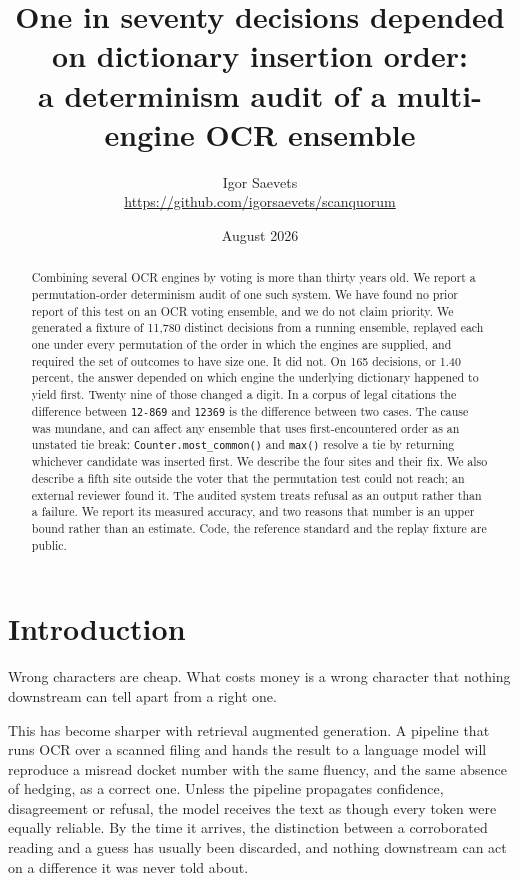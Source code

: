 \documentclass[11pt,a4paper]{article}
\title{One in seventy decisions depended on dictionary insertion order:\\
a determinism audit of a multi-engine OCR ensemble}
\author{Igor Saevets\\
\small\url{https://github.com/igorsaevets/scanquorum}}
\date{August 2026}
\begin{document}
\maketitle

\begin{abstract}
Combining several OCR engines by voting is more than thirty years old. We report a
permutation-order determinism audit of one such system. We have found no prior report of
this test on an OCR voting ensemble, and we do not claim priority.
We generated a fixture of 11{,}780 distinct decisions from a running ensemble, replayed
each one under every permutation of the order in which the engines are supplied, and
required the set of outcomes to have size one. It did not. On 165 decisions, or 1.40
percent, the answer depended on which engine the underlying dictionary happened to
yield first. Twenty nine of those changed a digit. In a corpus of legal citations the
difference between \texttt{12-869} and \texttt{12369} is the difference between two
cases. The cause was mundane, and can affect any ensemble that uses first-encountered order as an
unstated tie break: \texttt{Counter.most\_common()} and \texttt{max()} resolve a tie by
returning whichever candidate was inserted first. We describe the four sites and their fix.
We also describe a fifth site outside the voter that the permutation test could not reach;
an external reviewer found it. The audited system treats refusal as an output rather than a
failure. We report its measured accuracy, and two reasons that number is an upper bound
rather than an estimate. Code, the reference standard and the replay fixture are public.
\end{abstract}

\section{Introduction}

Wrong characters are cheap. What costs money is a wrong character that nothing downstream
can tell apart from a right one.

This has become sharper with retrieval augmented generation. A pipeline that runs OCR
over a scanned filing and hands the result to a language model will reproduce a misread
docket number with the same fluency, and the same absence of hedging, as a correct one.
Unless the pipeline propagates confidence, disagreement or refusal, the model receives the
text as though every token were equally reliable. By the time it arrives, the distinction
between a corroborated reading and a guess has usually been discarded, and nothing
downstream can act on a difference it was never told about.
\end{document}
